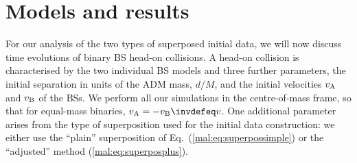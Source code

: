 
\section{Models and results}
\label{mal:sec:results}
%
For our analysis of the two types of superposed initial data,
we will now discuss time evolutions of binary BS head-on collisions.
A head-on collision is characterised
by the two individual BS models and three further parameters,
the initial separation in units of the ADM mass,
$d/M$,
and the initial velocities $v_{\rm A}$ and
$v_{\rm B}$ of the BSs. We perform all our simulations in the centre-of-mass
frame, so that for equal-mass binaries, $v_{\rm A}=-v_{\rm B}\invdefeq v$.
One additional parameter arises from the type of superposition
used for the initial data construction: we either use the
``plain'' superposition of Eq.~(\ref{mal:eq:superpossimple}) or
the ``adjusted'' method (\ref{mal:eq:superposplus}).

